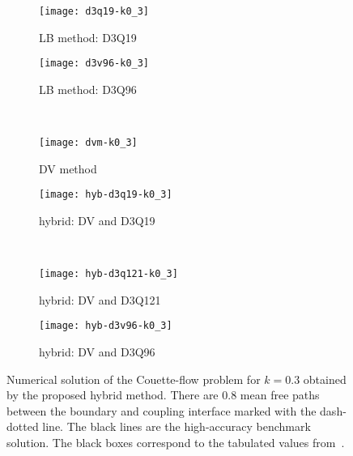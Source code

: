 \documentclass{elsarticle} %
\begin{document}
\begin{figure}
   \centering
   \begin{subfigure}[b]{0.5\textwidth}
       \texttt{[image: d3q19-k0\_3]}
       \caption{LB method: D3Q19}
       \label{fig:d3q19-k0_3}
   \end{subfigure}%
   \begin{subfigure}[b]{0.5\textwidth}
       \texttt{[image: d3v96-k0\_3]}
       \caption{LB method: D3Q96}
       \label{fig:d3q96-k0_3}
   \end{subfigure}\\
   \begin{subfigure}[b]{0.5\textwidth}
       \texttt{[image: dvm-k0\_3]}
       \caption{DV method}
       \label{fig:dvm-k0_3}
   \end{subfigure}%
   \begin{subfigure}[b]{0.5\textwidth}
       \texttt{[image: hyb-d3q19-k0\_3]}
       \caption{hybrid: DV and D3Q19}
       \label{fig:hyb:d3q19-k0_3}
   \end{subfigure}\\
   \begin{subfigure}[b]{0.5\textwidth}
       \texttt{[image: hyb-d3q121-k0\_3]}
       \caption{hybrid: DV and D3Q121}
       \label{fig:hyb:d3q121-k0_3}
   \end{subfigure}%
   \begin{subfigure}[b]{0.5\textwidth}
       \texttt{[image: hyb-d3v96-k0\_3]}
       \caption{hybrid: DV and D3Q96}
       \label{fig:hyb:d3q96-k0_3}
   \end{subfigure}
   \caption{
       Numerical solution of the Couette-flow problem for \(k=0.3\) obtained by the proposed hybrid method.
       There are \(0.8\) mean free paths between the boundary and coupling interface marked with the dash-dotted line.
       The black lines are the high-accuracy benchmark solution.
       The black boxes correspond to the tabulated values from~\cite{Luo2016}.
   }\label{fig:k0_3}
\end{figure}
\end{document}
